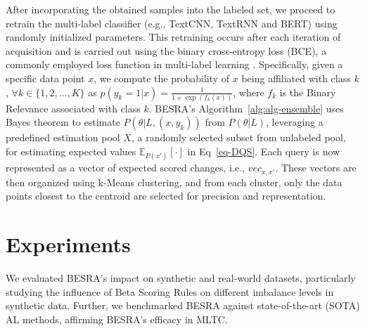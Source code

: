 \documentclass[letterpaper]{article} %
\begin{document}
After incorporating the obtained samples into the labeled set, we proceed to retrain the multi-label classifier (e.g., TextCNN, TextRNN and BERT) using randomly initialized parameters. This retraining occurs after each iteration of acquisition and is carried out using the binary cross-entropy loss (BCE), a commonly employed loss function in multi-label learning \cite{9319440}.
Specifically,
given a specific data point $x$, 
we compute the probability of $x$ being affiliated with class $k$,
$\forall k \in \{1, 2, \dots,  K\}$  as
$p(y_k = 1|x) = \frac{1}{1 + \exp(f_k(x))}$,
where $f_k$ is the Binary Relevance associated with class $k$.
BESRA's Algorithm~\ref{alg:alg-ensemble} uses Bayes theorem to estimate $P(\theta|L,(x,y_k))$ from $P(\theta|L)$, leveraging a predefined estimation pool $X$, a randomly selected subset from unlabeled pool, for estimating expected values $\mathbb{E}_{ P(x')}
[\cdot]$ in Eq~\eqref{eq-DQS}.
Each query is now represented as a vector of expected scored changes, i.e.,
$vec_{x,x'}$.
These vectors are then organized using k-Means clustering, and from each cluster, only the data points closest to the centroid are selected for precision and representation.






\section{Experiments}
\label{sec:experiment}

We evaluated BESRA's impact on synthetic and real-world datasets, particularly studying the influence of Beta Scoring Rules on different imbalance levels in synthetic data. Further, we benchmarked BESRA against state-of-the-art (SOTA) AL methods, affirming BESRA's efficacy in MLTC.

\end{document}
